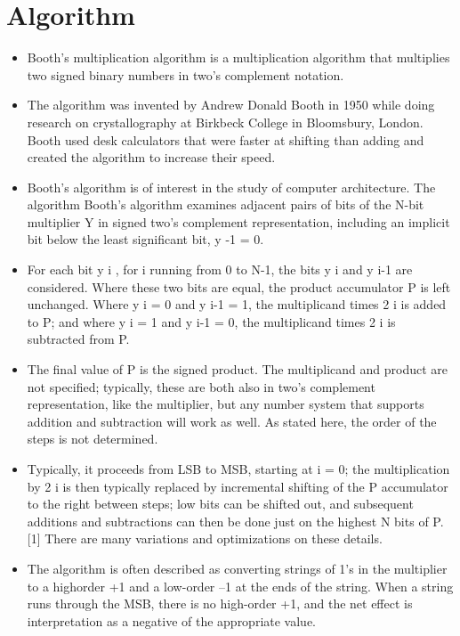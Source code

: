 \documentclass[a4paper,12pt]{article}
\begin{document}
	
\section{Algorithm}
	\begin{itemize}
		\item 	Booth's multiplication algorithm is a multiplication algorithm that multiplies two signed  binary numbers in two's complement notation.  
		\item 	The algorithm was invented by Andrew Donald Booth in 1950 while doing research on crystallography at Birkbeck College in Bloomsbury, London. Booth used desk calculators that were faster at shifting than adding and created the algorithm to increase 
		their speed.  
		\item 	Booth's algorithm is of interest in the study of computer architecture. The algorithm Booth's algorithm examines adjacent pairs of bits of the N-bit multiplier Y in signed two's complement representation, including an implicit bit below the least significant bit, 
		y -1 = 0.  
		\item 	For each bit y i , for i running from 0 to N-1, the bits y i and y i-1 are considered. Where these two bits are equal, the product accumulator P is left unchanged. Where y i = 0 and y i-1 = 1, the multiplicand times 2 i is added to P; and where y i = 1 and y i-1 = 0, the 
		multiplicand times 2 i is subtracted from P.  
		\item 	The final value of P is the signed product. The multiplicand and product are not specified; typically, these are both also in two's complement representation, like the multiplier, but any number system that supports addition and subtraction will work as 
		well. As stated here, the order of the steps is not determined.  
		\item 	Typically, it proceeds from LSB to MSB, starting at i = 0; the multiplication by 2 i is then typically replaced by incremental shifting of the P accumulator to the right between steps; low bits can be shifted out, and subsequent additions and subtractions can then be done just on the highest N bits of P.[1] There are many variations and optimizations on 
		these details.  
		\item 	The algorithm is often described as converting strings of 1's in the multiplier to a highorder +1 and a low-order –1 at the ends of the string. When a string runs through the MSB, there is no high-order +1, and the net effect is interpretation as a negative of the appropriate value.  
	\end{itemize}
	
\end{document}
